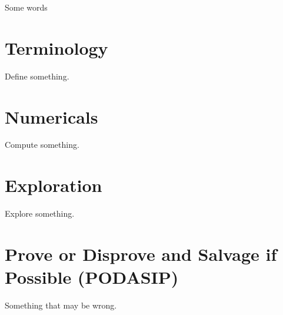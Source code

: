 \documentclass{homework}
\author{Jim Fowler}
\begin{document}
\maketitle

\begin{inspiration}
  Some words
\end{inspiration}

\section{Terminology}

\begin{problem}
  Define something.
\end{problem}

\section{Numericals}

\begin{problem}
  Compute something.
\end{problem}

\section{Exploration}

\begin{problem}
  Explore something.
\end{problem}

\section{Prove or Disprove and Salvage if Possible (PODASIP)}

\begin{problem}
  Something that may be wrong.
\end{problem}
\end{document}
